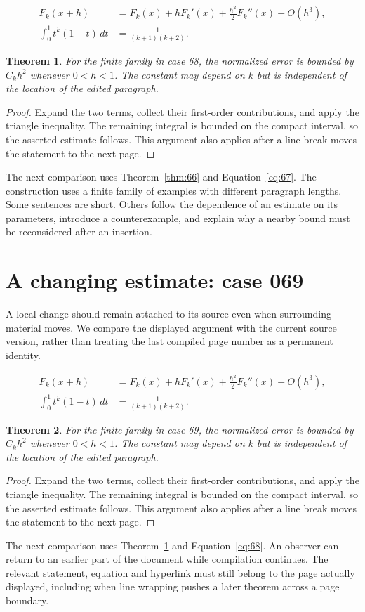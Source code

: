 \documentclass[a4paper,10pt]{article}
\newtheorem{theorem}{Theorem}[section]
\begin{document}
\lipsum[22-23]
\begin{align}\label{eq:67}
 F_k(x+h)&=F_k(x)+hF_k'(x)+\frac{h^2}{2}F_k''(x)+O(h^3),\\
 \int_0^1 t^k(1-t)\,dt&=\frac{1}{(k+1)(k+2)}.
\end{align}
\begin{theorem}\label{thm:67}
For the finite family in case 68, the normalized error is bounded by $C_k h^2$ whenever $0<h<1$. The constant may depend on $k$ but is independent of the location of the edited paragraph.
\end{theorem}
\begin{proof}
Expand the two terms, collect their first-order contributions, and apply the
triangle inequality. The remaining integral is bounded on the compact interval,
so the asserted estimate follows. This argument also applies after a line break
moves the statement to the next page.
\end{proof}
The next comparison uses Theorem~\ref{thm:66} and Equation~\ref{eq:67}. The construction uses a finite family of examples with different paragraph lengths. Some sentences are short. Others follow the dependence of an estimate on its parameters, introduce a counterexample, and explain why a nearby bound must be reconsidered after an insertion.

\lipsum[13]

\section{A changing estimate: case 069}\label{unit:68}
A local change should remain attached to its source even when surrounding material moves. We compare the displayed argument with the current source version, rather than treating the last compiled page number as a permanent identity.

\lipsum[25-26]
\begin{align}\label{eq:68}
 F_k(x+h)&=F_k(x)+hF_k'(x)+\frac{h^2}{2}F_k''(x)+O(h^3),\\
 \int_0^1 t^k(1-t)\,dt&=\frac{1}{(k+1)(k+2)}.
\end{align}
\begin{theorem}\label{thm:68}
For the finite family in case 69, the normalized error is bounded by $C_k h^2$ whenever $0<h<1$. The constant may depend on $k$ but is independent of the location of the edited paragraph.
\end{theorem}
\begin{proof}
Expand the two terms, collect their first-order contributions, and apply the
triangle inequality. The remaining integral is bounded on the compact interval,
so the asserted estimate follows. This argument also applies after a line break
moves the statement to the next page.
\end{proof}
The next comparison uses Theorem~\ref{thm:67} and Equation~\ref{eq:68}. An observer can return to an earlier part of the document while compilation continues. The relevant statement, equation and hyperlink must still belong to the page actually displayed, including when line wrapping pushes a later theorem across a page boundary.
\end{document}
